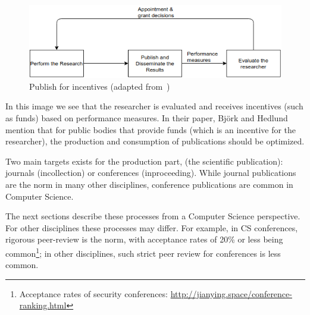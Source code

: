 \documentclass{ou-report}
\newcommand{\todo}[1]{{\color{red} TODO: #1}}
\begin{document}
\begin{figure}[H]
\centering
\includegraphics[width=12cm]{images/publication_process.drawio.png}
\caption{Publish for incentives (adapted from~\cite{BH2004})}
\label{fig:publish_incentives}
\end{figure}

In this image we see that the researcher is evaluated and receives incentives 
(such as funds) based on performance measures. In their paper,  Bj\"ork and 
Hedlund mention that for public bodies that provide funds (which is an incentive 
for the researcher), the production and consumption of publications should be 
optimized.
    


Two main targets exists for the production part, (the scientific publication): 
journals (incollection) or 
conferences (inproceeding). While journal publications are the norm in many 
other disciplines, conference publications are common in Computer Science.

The next sections describe these processes from a Computer Science perspective. 
For other disciplines these processes may differ. For example, in CS 
conferences, rigorous peer-review is the norm, with acceptance rates of 20\% or 
less being common\footnote{Acceptance rates of security conferences: \url{http://jianying.space/conference-ranking.html}}; in other disciplines, such strict peer review for conferences is
less common.
    
\end{document}
